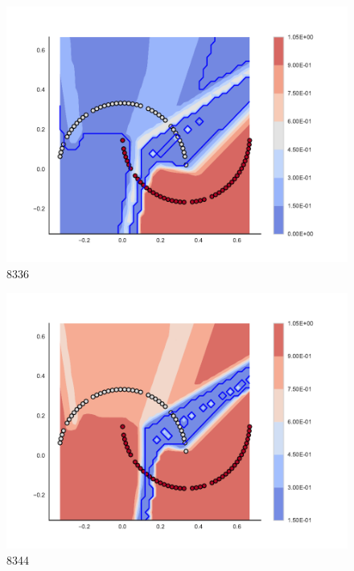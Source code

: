 \begin{subfigure}[b]{0.09\textwidth}
    \includegraphics[clip, trim=2.35cm 1.75cm 4.5cm 0cm,width=\textwidth]{img/convergence/8336.pdf}
    \caption{8336}
    \label{fig:convergence_8336}
\end{subfigure}
%
\begin{subfigure}[b]{0.09\textwidth}
    \includegraphics[clip, trim=2.35cm 1.75cm 4.5cm 0cm,width=\textwidth]{img/convergence/8344.pdf}
    \caption{8344}
    \label{fig:convergence_8344}
\end{subfigure}
%
